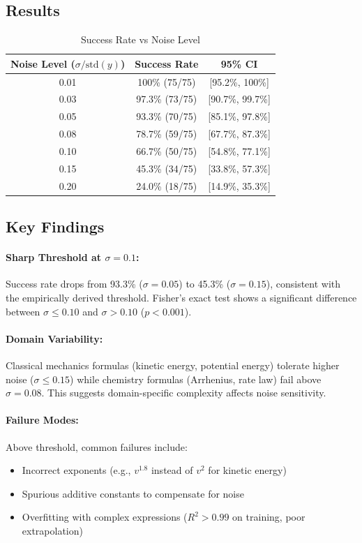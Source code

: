 \documentclass[twoside,11pt]{article}
\begin{document}
\subsection{Results}

\begin{table}[H]
\centering
\caption{Success Rate vs Noise Level}
\label{tab:noise_sensitivity}
\begin{tabular}{@{}ccc@{}}
\toprule
\textbf{Noise Level ($\sigma / \text{std}(y)$)} & \textbf{Success Rate} & \textbf{95\% CI} \\
\midrule
0.01 & 100\% (75/75) & [95.2\%, 100\%] \\
0.03 & 97.3\% (73/75) & [90.7\%, 99.7\%] \\
0.05 & 93.3\% (70/75) & [85.1\%, 97.8\%] \\
0.08 & 78.7\% (59/75) & [67.7\%, 87.3\%] \\
0.10 & 66.7\% (50/75) & [54.8\%, 77.1\%] \\
0.15 & 45.3\% (34/75) & [33.8\%, 57.3\%] \\
0.20 & 24.0\% (18/75) & [14.9\%, 35.3\%] \\
\bottomrule
\end{tabular}
\end{table}

\subsection{Key Findings}

\paragraph{Sharp Threshold at $\sigma = 0.1$:}
Success rate drops from 93.3\% ($\sigma = 0.05$) to 45.3\% ($\sigma = 0.15$), consistent with the empirically derived threshold. Fisher's exact test shows a significant difference between $\sigma \leq 0.10$ and $\sigma > 0.10$ ($p < 0.001$).

\paragraph{Domain Variability:}
Classical mechanics formulas (kinetic energy, potential energy) tolerate higher noise ($\sigma \leq 0.15$) while chemistry formulas (Arrhenius, rate law) fail above $\sigma = 0.08$. This suggests domain-specific complexity affects noise sensitivity.

\paragraph{Failure Modes:}
Above threshold, common failures include:
\begin{itemize}
\item Incorrect exponents (e.g., $v^{1.8}$ instead of $v^2$ for kinetic energy)
\item Spurious additive constants to compensate for noise
\item Overfitting with complex expressions ($R^2 > 0.99$ on training, poor extrapolation)
\end{itemize}
\end{document}
